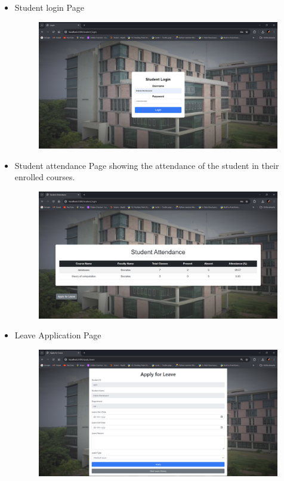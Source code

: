 \documentclass{article}
\begin{document}
\begin{itemize}
    \item \thispagestyle{empty}
    {\large{Student login Page}}
    \begin{figure}[H]
        \centering
        \includegraphics[width=1.1\textwidth, center]{13}
    \end{figure}

    \vspace*{2cm}

    \item \thispagestyle{empty}
    {\large{Student attendance Page showing the attendance of the student
    in their enrolled courses.}}
    \begin{figure}[H]
        \centering
        \includegraphics[width=1.1\textwidth, center]{14}
    \end{figure}

    \newpage

    \item \thispagestyle{empty}
    {\large{Leave Application Page}}
    \begin{figure}[H]
        \centering
        \includegraphics[width=1.1\textwidth, center]{15}
    \end{figure}
    

\end{itemize}
\end{document}
